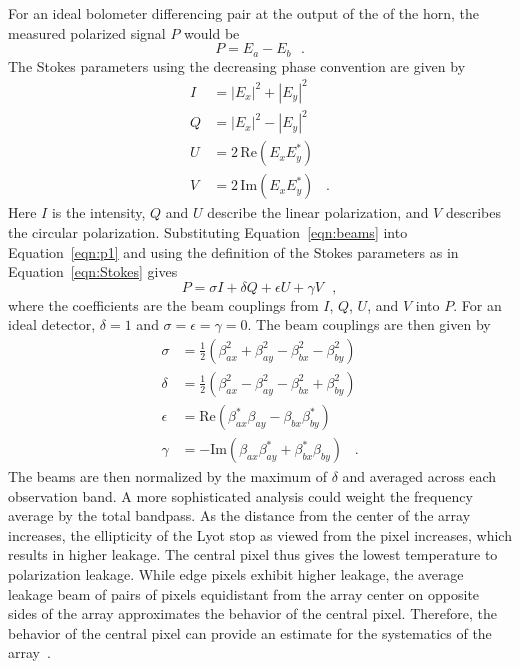 For an ideal bolometer differencing pair at the output of the of the horn, the measured polarized signal $P$ would be
\begin{equation}\label{eqn:p1}
P=E_a-E_b \,\,\,\,.
\end{equation}
The Stokes parameters using the decreasing phase convention are given by
\begin{align}\label{eqn:Stokes}
I & =  |E_{x}|^2+ |E_{y}|^2  \nonumber \\
Q & =   |E_{x}|^2- |E_{y}|^2  \nonumber \\
U & =  2\,\mathrm{Re}(E_{x} E_{y}^{*}) \nonumber \\
V & =  2\,\mathrm{Im}(E_{x} E_{y}^{*})\,\,\,\,\,.
\end{align}
Here $I$ is the intensity, $Q$ and $U$ describe the linear polarization, and $V$ describes the circular polarization. Substituting Equation~\ref{eqn:beams} into Equation~\ref{eqn:p1} and using the definition of the Stokes parameters  as in Equation~\ref{eqn:Stokes} gives
\begin{equation}
P=\sigma I + \delta Q + \epsilon U+ \gamma V\,\,\,\, ,
\end{equation}
where the coefficients are the beam couplings from $I$, $Q$, $U$, and $V$ into $P$. For an ideal detector, $\delta=1$ and $\sigma=\epsilon=\gamma=0$. The beam couplings are then given by
\begin{align}\label{eqn:leakage beams}
\sigma & =  \frac{1}{2} (\beta_{ax}^2 + \beta_{ay}^2 - \beta_{bx}^2 - \beta_{by}^2) \\
\delta & =   \frac{1}{2} (\beta_{ax}^2 - \beta_{ay}^2 - \beta_{bx}^2 + \beta_{by}^2) \\
\epsilon & =  \mathrm{Re}(\beta_{ax}^{*} \beta_{ay} - \beta_{bx}\beta_{by}^{*} )  \\
\gamma & =  -\mathrm{Im}(\beta_{ax} \beta_{ay}^{*} + \beta_{bx}^{*}\beta_{by} )\,\,\,\,\,.
\end{align}
The beams are then normalized by the maximum of $\delta$ and averaged across each observation band. A more sophisticated analysis could weight the frequency average by the total bandpass. As the distance from the center of the array increases, the ellipticity of the Lyot stop as viewed from the pixel increases, which results in higher leakage. The central pixel thus gives the lowest temperature to polarization leakage. While edge pixels exhibit higher leakage, the average leakage beam of pairs of pixels equidistant from the array center on opposite sides of the array approximates the behavior of the central pixel. Therefore, the behavior of the central pixel can provide an estimate for the systematics of the array~\cite{Simon_Thesis_2016}.

